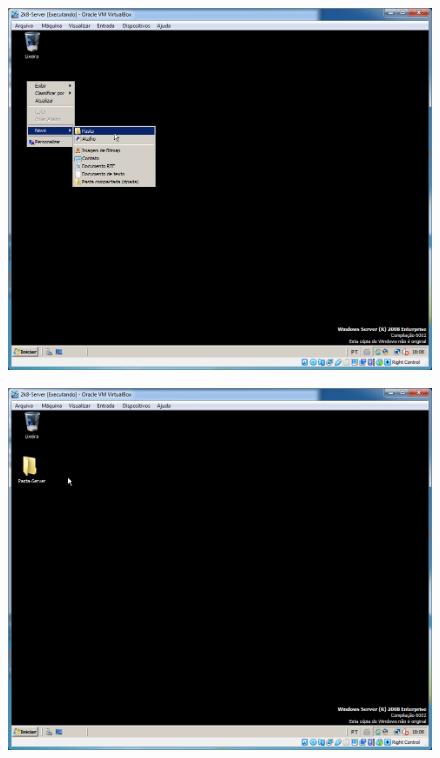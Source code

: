 \documentclass[10pt]{article}
\begin{document}
\begin{figure}[H]
    \centering
    \caption{}
    \label{fig:5111}
    \includegraphics[width=\linewidth]{images/windows_server/compartilhamento/001.png}
\end{figure}
\begin{figure}[H]
    \centering
    \caption{}
    \label{fig:5112}
    \includegraphics[width=\linewidth]{images/windows_server/compartilhamento/002.png}
\end{figure}
\end{document}
